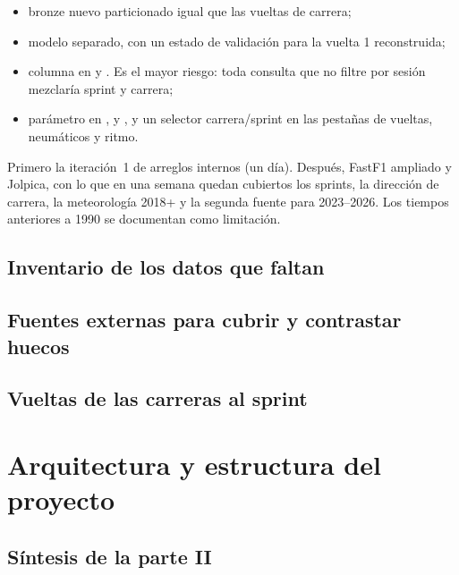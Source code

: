 \documentclass[11pt,openany]{report}
\newcommand{\parte}[2]{\part{#1}\label{#2}}
\begin{document}
\begin{itemize}
  \item bronze nuevo  particionado igual que las vueltas de carrera;
  \item modelo  separado, con un estado de validación  para
  la vuelta 1 reconstruida;
  \item columna  en  y . Es el
  mayor riesgo: toda consulta que no filtre por sesión mezclaría sprint y carrera;
  \item parámetro  en ,  y , y
  un selector carrera/sprint en las pestañas de vueltas, neumáticos y ritmo.
\end{itemize}

\begin{recomendacion}
Primero la iteración~1 de arreglos internos (un día). Después, FastF1 ampliado y Jolpica, con lo
que en una semana quedan cubiertos los sprints, la dirección de carrera, la meteorología 2018+ y la
segunda fuente para 2023–2026. Los tiempos anteriores a 1990 se documentan como limitación.
\end{recomendacion}

\chapter{Inventario de los datos que faltan}\label{cap:huecos}


\chapter{Fuentes externas para cubrir y contrastar huecos}\label{cap:fuentes}


\chapter{Vueltas de las carreras al sprint}\label{cap:sprint}


\parte{Arquitectura y estructura del proyecto}{parte:arq}

\chapter*{Síntesis de la parte II}
\end{document}

